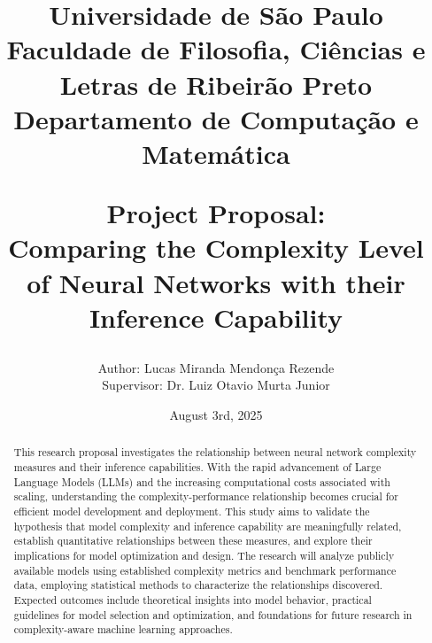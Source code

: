\documentclass[12pt,a4paper]{article}
\title{
    {\small 
        Universidade de São Paulo\\
        Faculdade de Filosofia, Ciências e Letras de Ribeirão Preto\\
        Departamento de Computação e Matemática\\[1cm]
    }

    \vspace*{\fill}
    Project Proposal:\\
    Comparing the Complexity Level of Neural Networks with their Inference Capability
    \vspace*{\fill}
}
\author{
    Author: Lucas Miranda Mendonça Rezende\\ 
    Supervisor: Dr. Luiz Otavio Murta Junior
}
\date{August 3rd, 2025}
\begin{document}
        \maketitle

    \newpage
        \vspace*{\fill}
            \begin{abstract}
                This research proposal investigates the relationship between neural network complexity measures and their inference capabilities. With the rapid advancement of Large Language Models (LLMs) and the increasing computational costs associated with scaling, understanding the complexity-performance relationship becomes crucial for efficient model development and deployment. This study aims to validate the hypothesis that model complexity and inference capability are meaningfully related, establish quantitative relationships between these measures, and explore their implications for model optimization and design. The research will analyze publicly available models using established complexity metrics and benchmark performance data, employing statistical methods to characterize the relationships discovered. Expected outcomes include theoretical insights into model behavior, practical guidelines for model selection and optimization, and foundations for future research in complexity-aware machine learning approaches.
            \end{abstract}
        \vspace*{\fill}

    \newpage
        \tableofcontents

    \newpage
    

    \newpage
    

    \newpage
    

    \newpage
    

    \newpage
    
\end{document}
